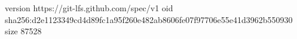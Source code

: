 version https://git-lfs.github.com/spec/v1
oid sha256:d2e1123349cd4d89fc1a95f260e482ab8606fe07f97706e55e41d3962b550930
size 87528
